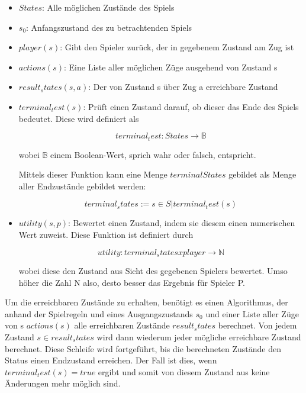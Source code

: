 \begin{itemize}
\item \textbf{$States$}: Alle möglichen Zustände des Spiels
\item \textbf{$s_0$}: Anfangszustand des zu betrachtenden Spiels
\item \textbf{$player(s)$}: Gibt den Spieler zurück, der in gegebenem Zustand am Zug ist
\item \textbf{$actions(s)$}: Eine Liste aller möglichen Züge ausgehend von Zustand s
\item \textbf{$result_states(s,a)$}: Der von Zustand s über Zug a erreichbare Zustand
\item \textbf{$terminal_test(s)$}: Prüft einen Zustand darauf, ob dieser das Ende des Spiels bedeutet. Diese wird definiert als

\begin{equation}
terminal_test : States \rightarrow \mathbb{B}
\end{equation}

wobei $\mathbb{B}$ einem Boolean-Wert, sprich wahr oder falsch, entspricht.

Mittels dieser Funktion kann eine Menge $terminalStates$ gebildet als Menge aller Endzustände gebildet werden:

\begin{equation}
terminal_states := {s \in S | terminal_test(s)}
\end{equation}

\item \textbf{$utility(s, p)$}: Bewertet einen Zustand, indem sie diesem einen numerischen Wert zuweist. Diese Funktion ist definiert durch

\begin{equation}
utility : terminal_states x player \rightarrow \mathbb{N}
\end{equation}

wobei diese den Zustand aus Sicht des gegebenen Spielers bewertet. Umso höher die Zahl N also, desto besser das Ergebnis für Spieler P.
\end{itemize}

Um die erreichbaren Zustände zu erhalten, benötigt es einen Algorithmus, der anhand der Spielregeln und eines Ausgangszustands $s_0$ und einer Liste aller Züge von s $actions(s)$ alle erreichbaren Zustände $result_states$ berechnet. Von jedem Zustand $s \in result_states$ wird dann wiederum jeder mögliche erreichbare Zustand berechnet. Diese Schleife wird fortgeführt, bis die berechneten Zustände den Status einen Endzustand erreichen. Der Fall ist dies, wenn $terminal_test(s) = true$ ergibt und somit von diesem Zustand aus keine Änderungen mehr möglich sind.

